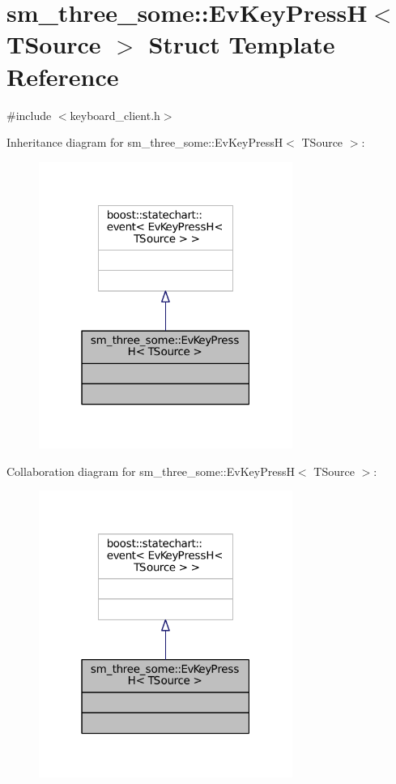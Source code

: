 \hypertarget{structsm__three__some_1_1EvKeyPressH}{}\section{sm\+\_\+three\+\_\+some\+:\+:Ev\+Key\+PressH$<$ T\+Source $>$ Struct Template Reference}
\label{structsm__three__some_1_1EvKeyPressH}


{\ttfamily \#include $<$keyboard\+\_\+client.\+h$>$}



Inheritance diagram for sm\+\_\+three\+\_\+some\+:\+:Ev\+Key\+PressH$<$ T\+Source $>$\+:
\nopagebreak
\begin{figure}[H]
\begin{center}
\leavevmode
\includegraphics[width=235pt]{structsm__three__some_1_1EvKeyPressH__inherit__graph}
\end{center}
\end{figure}


Collaboration diagram for sm\+\_\+three\+\_\+some\+:\+:Ev\+Key\+PressH$<$ T\+Source $>$\+:
\nopagebreak
\begin{figure}[H]
\begin{center}
\leavevmode
\includegraphics[width=235pt]{structsm__three__some_1_1EvKeyPressH__coll__graph}
\end{center}
\end{figure}


